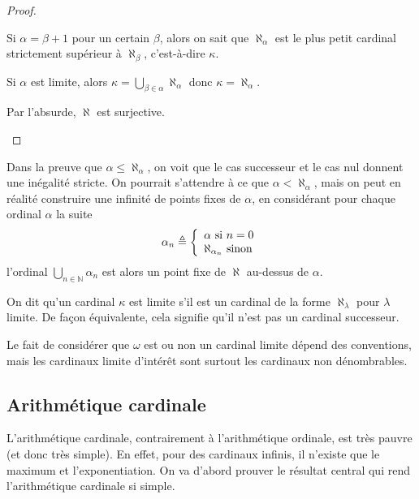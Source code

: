 \begin{proof}
\begin{enumerate}[label=(\roman*)]
    Si $\alpha = \beta + 1$ pour un certain $\beta$, alors on sait que
    $\aleph_{\alpha}$ est le plus petit cardinal strictement supérieur à
    $\aleph_\beta$, c'est-à-dire $\kappa$.
    
    Si $\alpha$ est limite, alors
    $\displaystyle\kappa = \bigcup_{\beta \in \alpha} \aleph_\alpha$
    donc $\kappa = \aleph_\alpha$.

    Par l'absurde, $\aleph$ est surjective.
  \end{enumerate}
\end{proof}

\begin{remark}
  Dans la preuve que $\alpha \leq \aleph_\alpha$, on voit que le cas successeur
  et le cas nul donnent une inégalité stricte. On pourrait s'attendre à ce que
  $\alpha < \aleph_\alpha$, mais on peut en réalité construire une infinité de
  points fixes de $\alpha$, en considérant pour chaque ordinal $\alpha$ la suite
  \[\alpha_n \triangleq \left\{\begin{array}{l}
  \alpha \text{ si } n = 0\\
  \aleph_{\alpha_n} \text{ sinon}
  \end{array}\right.\]
  l'ordinal $\displaystyle\bigcup_{n \in \mathbb N} \alpha_n$ est alors un
  point fixe de $\aleph$ au-dessus de $\alpha$.
\end{remark}

\begin{definition}
  On dit qu'un cardinal $\kappa$ est limite s'il est un cardinal de la forme
  $\aleph_{\lambda}$ pour $\lambda$ limite. De façon équivalente, cela signifie
  qu'il n'est pas un cardinal successeur.
\end{definition}

\begin{remark}
  Le fait de considérer que $\omega$ est ou non un cardinal limite dépend des
  conventions, mais les cardinaux limite d'intérêt sont surtout les cardinaux
  non dénombrables.
\end{remark}

\subsection{Arithmétique cardinale}

L'arithmétique cardinale, contrairement à l'arithmétique ordinale, est très
pauvre (et donc très simple). En effet, pour des cardinaux infinis, il n'existe
que le maximum et l'exponentiation. On va d'abord prouver le résultat central
qui rend l'arithmétique cardinale si simple.

